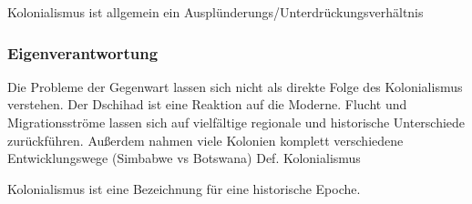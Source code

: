 \documentclass{article}
\begin{document}
Kolonialismus ist allgemein ein Ausplünderungs/Unterdrückungsverhältnis

\subsubsection*{Eigenverantwortung}
Die Probleme der Gegenwart lassen sich nicht als direkte Folge des Kolonialismus verstehen.
Der Dschihad ist eine Reaktion auf die Moderne. Flucht und Migrationsströme lassen sich auf vielfältige regionale und historische
Unterschiede zurückführen. Außerdem nahmen viele Kolonien komplett verschiedene Entwicklungswege (Simbabwe vs Botswana)
Def. Kolonialismus

Kolonialismus ist eine Bezeichnung für eine historische Epoche.
\end{document}
